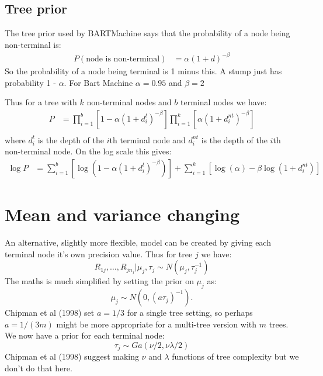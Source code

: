 \documentclass{article}
\begin{document}
\subsection*{Tree prior}

The tree prior used by BARTMachine says that the probability of a node being non-terminal is:
\begin{align*}
P(\mbox{node is non-terminal}) &= \alpha (1 + d)^{-\beta}
\end{align*}
So the probability of a node being terminal is 1 minus this. A stump just has probability 1 - $\alpha$. For Bart Machine $\alpha = 0.95$ and $\beta = 2$

Thus for a tree with $k$ non-terminal nodes and $b$ terminal nodes we have:
\begin{align*}
P &= \prod_{i=1}^b \left[ 1 - \alpha (1 + d^t_i)^{-\beta} \right] \prod_{i=1}^k \left[ \alpha (1 + d^{nt}_i)^{-\beta} \right] \\
\end{align*}
where $d^t_i$ is the depth of the $i$th terminal node and $d^{nt}_i$ is the depth of the $i$th non-terminal node.
On the log scale this gives:
\begin{align}
\log P &= \sum_{i=1}^b \left[ \log \left(1 - \alpha(1 + d^t_i)^{-\beta} \right) \right] + \sum_{i=1}^k \left[ \log(\alpha) - \beta \log(1 + d^{nt}_i) \right]
\end{align}

\section*{Mean and variance changing}

An alternative, slightly more flexible, model can be created by giving each terminal node it's own precision value. Thus for tree $j$ we have:
$$ R_{1j}, \ldots, R_{jn_j} | \mu_j, \tau_j \sim N(\mu_j, \tau_j^{-1})$$
The maths is much simplified by setting the prior on $\mu_j$ as:
$$\mu_j \sim N(0, (a \tau_j)^{-1}).$$
Chipman et al (1998) set $a = 1/3$ for a single tree setting, so perhaps $a = 1/(3m)$ might be more appropriate for a multi-tree version with $m$ trees.\\

We now have a prior for each terminal node:
$$\tau_j \sim Ga(\nu/2, \nu \lambda / 2)$$
Chipman et al (1998) suggest making $\nu$ and $\lambda$ functions of tree complexity but we don't do that here.\\
\end{document}
